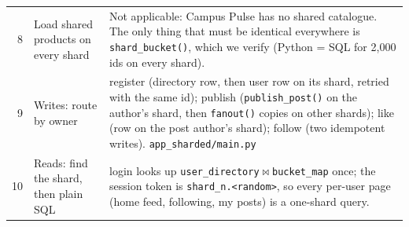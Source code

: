 \begin{center}
\begin{tabularx}{\linewidth}{@{}r>{\raggedright}p{4.1cm}>{\raggedright\arraybackslash}X@{}}
8 & Load shared products on every shard & Not applicable: Campus Pulse has no shared catalogue. The only
  thing that must be identical everywhere is \texttt{shard\_bucket()}, which we verify (Python = SQL for 2{,}000 ids on every shard). \\
9 & Writes: route by owner & register (directory row, then user row on its shard, retried with the same id);
  publish (\texttt{publish\_post()} on the author's shard, then \texttt{fanout()} copies on other shards);
  like (row on the post author's shard); follow (two idempotent writes). \texttt{app\_sharded/main.py} \\
10 & Reads: find the shard, then plain SQL & login looks up \texttt{user\_directory}$\bowtie$\texttt{bucket\_map} once; the session token is
  \texttt{shard\_n.<random>}, so every per-user page (home feed, following, my posts) is a one-shard query. \\
\bottomrule
\end{tabularx}
\end{center}

